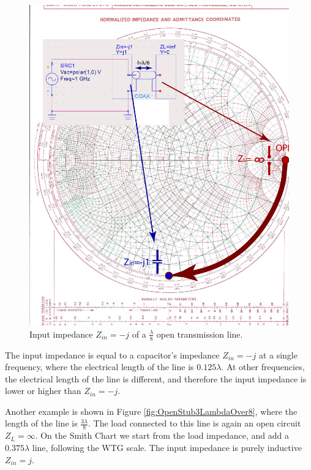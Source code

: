 \documentclass{ximera}
\begin{document}
\begin{figure}[htbp]
\begin{center}
\includegraphics[scale=1]{../jpg/openstub-01.jpg}
\end{center}
\caption{Input impedance $Z_{in}=-j$ of a $\frac{\lambda}{8}$ open transmission line.}
\label{fig:OpenStubLambdaOver8}
\end{figure}

The input impedance  is equal to a capacitor's impedance $Z_{in}=-j$ at a single frequency, where the electrical length of the line is $0.125 \lambda$. At other frequencies, the electrical length of the line is different, and therefore the input impedance is lower or higher than $Z_{in}=-j$.



Another example is shown in Figure \ref{fig:OpenStub3LambdaOver8}, where the length of the line is  $\frac{3 \lambda}{8}$. The load connected to this line is again an open circuit $Z_L=\infty$. On the Smith Chart we start from the load impedance, and add a $0.375 \lambda$ line, following the WTG scale. The input impedance is purely inductive $Z_{in}=j$.
\end{document}
